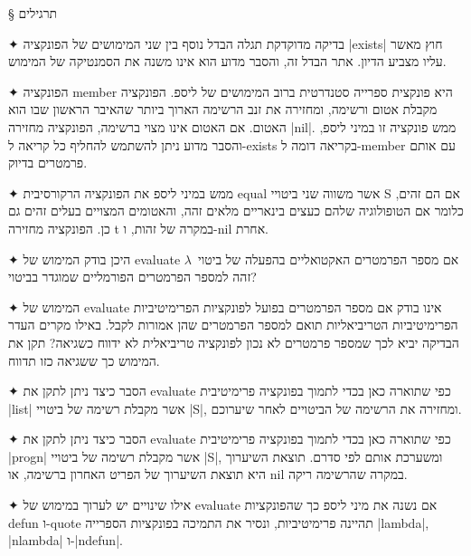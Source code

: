 § תרגילים
\begin{enumerate}
✦ בדיקה מדוקדקת תגלה הבדל נוסף בין שני המימושים של הפונקציה \E|exists| חוץ מאשר
עליו מצביע הדיון. אתר הבדל זה, והסבר מדוע הוא אינו משנה את הסמנטיקה של המימוש.

✦ הפונקציה member היא פונקצית ספרייה סטנדרטית ברוב המימושים של ליספ. הפונקציה
מקבלת אטום ורשימה, ומחזירה את זנב הרשימה הארוך ביותר שהאיבר הראשון שבו הוא
האטום. אם האטום אינו מצוי ברשימה, הפונקציה מחזירה \E|nil|. ממש פונקציה זו
במיני ליספ, והסבר מדוע ניתן להשתמש להחליף כל קריאה ל-exists בקריאה דומה
ל-member עם אותם פרמטרים בדיוק.

✦ ממש במיני ליספ את הפונקציה הרקורסיבית equal אשר משווה שני ביטויי S אם הם
זהים, כלומר אם הטופולוגיה שלהם כעצים בינאריים מלאים זהה, והאטומים המצויים בעלים
זהים גם כן. הפונקציה מחזירה t במקרה של זהות, ו-nil אחרת.

✦ היכן בודק המימוש של evaluate אם מספר הפרמטרים האקטואליים בהפעלה של ביטוי~$λ$
זהה למספר הפרמטרים הפורמליים שמוגדר בביטוי?

✦ המימוש של evaluate אינו בודק אם מספר הפרמטרים בפועל לפונקציות הפרימיטיביות
הפרימיטיביות הטריביאליות תואם למספר הפרמטרים שהן אמורות לקבל. באילו מקרים העדר
הבדיקה יביא לכך שמספר פרמטרים לא נכון לפונקציה טריביאלית לא ידווח כשגיאה? תקן
את המימוש כך ששגיאה כזו תדווח.

✦ הסבר כיצד ניתן לתקן את evaluate כפי שתוארה כאן בכדי לתמוך בפונקציה פרימיטיבית
\E|list| אשר מקבלת רשימה של ביטויי \E|S|, ומחזירה את הרשימה של הביטויים לאחר
שיערוכם.

✦ הסבר כיצד ניתן לתקן את evaluate כפי שתוארה כאן בכדי לתמוך בפונקציה פרימיטיבית
\E|progn| אשר מקבלת רשימה של ביטויי \E|S|, ומשערכת אותם לפי סדרם. תוצאת השיערוך
היא תוצאת השיערוך של הפריט האחרון ברשימה, או nil במקרה שהרשימה ריקה.

✦ אילו שינויים יש לערוך במימוש של evaluate אם נשנה את מיני ליספ כך שהפונקציות
defun ו-quote תהיינה פרימיטיביות, ונסיר את התמיכה בפונקציות הספרייה \E|lambda|,
\E|nlambda| ו-\E|ndefun|.


\end{enumerate}
